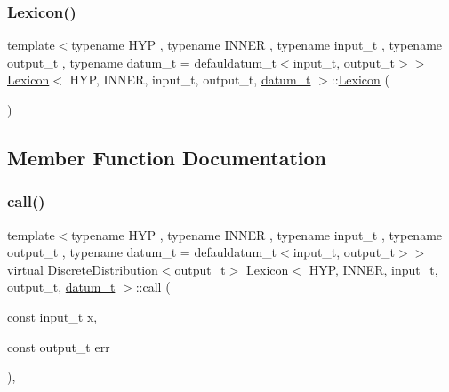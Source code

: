 \mbox{\label{class_lexicon_ab027c90715b8616af424c6682cdfef0f}} 
\subsubsection{\texorpdfstring{Lexicon()}{Lexicon()}\hspace{0.1cm}{\footnotesize\ttfamily [2/2]}}
{\footnotesize\ttfamily template$<$typename H\+YP , typename I\+N\+N\+ER , typename input\+\_\+t , typename output\+\_\+t , typename datum\+\_\+t  = defauldatum\+\_\+t$<$input\+\_\+t, output\+\_\+t$>$$>$ \\
\hyperlink{class_lexicon}{Lexicon}$<$ H\+YP, I\+N\+N\+ER, input\+\_\+t, output\+\_\+t, \hyperlink{class_bayesable_a9f1a6c0cd7855550fa10b1a8f13a5867}{datum\+\_\+t} $>$\+::\hyperlink{class_lexicon}{Lexicon} (\begin{DoxyParamCaption}{ }\end{DoxyParamCaption})\hspace{0.3cm}{\ttfamily [inline]}}



\subsection{Member Function Documentation}
\mbox{\label{class_lexicon_afc6b762f68c6033a501ce7ca04b01ece}} 
\subsubsection{\texorpdfstring{call()}{call()}}
{\footnotesize\ttfamily template$<$typename H\+YP , typename I\+N\+N\+ER , typename input\+\_\+t , typename output\+\_\+t , typename datum\+\_\+t  = defauldatum\+\_\+t$<$input\+\_\+t, output\+\_\+t$>$$>$ \\
virtual \hyperlink{class_discrete_distribution}{Discrete\+Distribution}$<$output\+\_\+t$>$ \hyperlink{class_lexicon}{Lexicon}$<$ H\+YP, I\+N\+N\+ER, input\+\_\+t, output\+\_\+t, \hyperlink{class_bayesable_a9f1a6c0cd7855550fa10b1a8f13a5867}{datum\+\_\+t} $>$\+::call (\begin{DoxyParamCaption}\item[{const input\+\_\+t}]{x,  }\item[{const output\+\_\+t}]{err }\end{DoxyParamCaption})\hspace{0.3cm}{\ttfamily [inline]}, {\ttfamily [virtual]}}

